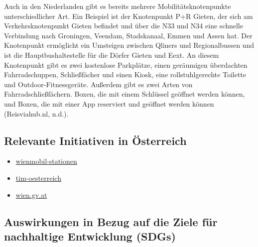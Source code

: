 \documentclass[
]{book}
\providecommand{\tightlist}{%
  \setlength{\itemsep}{0pt}\setlength{\parskip}{0pt}}
\begin{document}
Auch in den Niederlanden gibt es bereits mehrere Mobilitätsknotenpunkte unterschiedlicher Art. Ein Beispiel ist der Knotenpunkt P+R Gieten, der sich am Verkehrsknotenpunkt Gieten befindet und über die N33 und N34 eine schnelle Verbindung nach Groningen, Veendam, Stadskanaal, Emmen und Assen hat. Der Knotenpunkt ermöglicht ein Umsteigen zwischen Qliners und Regionalbussen und ist die Hauptbushaltestelle für die Dörfer Gieten und Eext. An diesem Knotenpunkt gibt es zwei kostenlose Parkplätze, einen geräumigen überdachten Fahrradschuppen, Schließfächer und einen Kiosk, eine rollstuhlgerechte Toilette und Outdoor-Fitnessgeräte. Außerdem gibt es zwei Arten von Fahrradschließfächern. Boxen, die mit einem Schlüssel geöffnet werden können, und Boxen, die mit einer App reserviert und geöffnet werden können (Reisviahub.nl, n.d.).

\hypertarget{relevante-initiativen-in-uxf6sterreich-28}{%
\subsection*{Relevante Initiativen in Österreich}\label{relevante-initiativen-in-uxf6sterreich-28}}

\begin{itemize}
\tightlist
\item
  \href{https://www.wienerlinien.at/web/wiener-linien/wienmobil-stationen}{wienmobil-stationen}
\item
  \href{https://www.tim-oesterreich.at}{tim-oesterreich}
\item
  \href{https://www.wien.gv.at/stadtentwicklung/studien/pdf/b008521.pdf}{wien.gv.at}
\end{itemize}

\hypertarget{auswirkungen-in-bezug-auf-die-ziele-fuxfcr-nachhaltige-entwicklung-sdgs-28}{%
\subsection*{Auswirkungen in Bezug auf die Ziele für nachhaltige Entwicklung (SDGs)}\label{auswirkungen-in-bezug-auf-die-ziele-fuxfcr-nachhaltige-entwicklung-sdgs-28}}
\end{document}
